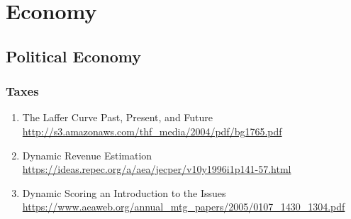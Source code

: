\documentclass{article}
\begin{document}
\section{Economy}
\subsection {Political Economy}
\subsubsection{Taxes}
\begin{enumerate}
	\item {The Laffer Curve Past, Present, and Future\\
\url{http://s3.amazonaws.com/thf_media/2004/pdf/bg1765.pdf}}
	\item {Dynamic Revenue Estimation\\
\url{https://ideas.repec.org/a/aea/jecper/v10y1996i1p141-57.html}}
	\item {Dynamic Scoring an Introduction to the Issues\\
\url{https://www.aeaweb.org/annual_mtg_papers/2005/0107_1430_1304.pdf}}
\end{enumerate}
\end{document}
